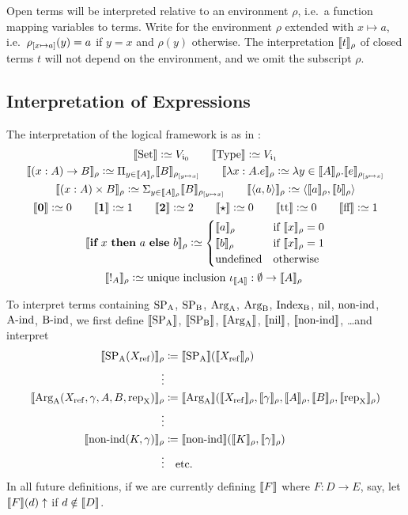 \documentclass{article}
\begin{document}
Open terms will be interpreted relative to an environment $\rho$, i.e.\ a
function mapping variables to terms. Write  for the
environment $\rho$ extended with $x \mapsto a$, i.e.\ $\rhoextend{x}{a}(y) = a$
if $y = x$ and $\rho(y)$ otherwise. The interpretation $\sem{t}_{\rho}$ of closed
terms $t$ will not depend on the environment, and we omit the subscript $\rho$.

\subsection{Interpretation of Expressions}
\noindent 
The interpretation of the logical framework is as in
\cite{dybjersetzer1999finax}:
\begin{gather*}
\sem{\Set} \colonsimeq V_{\cardz} \qquad \sem{\TYPE} \colonsimeq V_{\cardi} \\
\sem{(x : A) \to B}_\rho \colonsimeq \Pi_{y \in
  \sem{A}_\rho}\sem{B}_{\rhoextend{y}{x}} \qquad
\sem{\lambda x:A.e}_\rho \colonsimeq \lambda y \in
\sem{A}_\rho.\sem{e}_{\rhoextend{y}{x}} \\
\sem{(x : A) \times B}_\rho \colonsimeq \Sigma_{y \in
  \sem{A}_\rho}\sem{B}_{\rhoextend{y}{x}} \qquad
\sem{\langle a, b \rangle}_\rho \colonsimeq \langle \sem{a}_\rho ,
\sem{b}_\rho\rangle \\
\sem{\zero} \colonsimeq 0 \qquad \sem{\one} \colonsimeq 1 \qquad
\sem{\two} \colonsimeq 2 \qquad \sem{\oneelt} \colonsimeq 0 \qquad \sem{\twott} \colonsimeq 0 \qquad
\sem{\twoff} \colonsimeq 1\\
\sem{\IF~x~\THEN~a~\ELSE~b}_\rho \colonsimeq
\begin{cases}
\sem{a}_\rho & \text{if $\sem{x}_\rho = 0$} \\
\sem{b}_\rho & \text{if $\sem{x}_\rho = 1$} \\
\text{undefined} & \text{otherwise} \\
\end{cases} \\
\sem{!_A}_\rho \colonsimeq \text{unique inclusion $\iota_{\sem{A}} : \emptyset \to \sem{A}_\rho$ }
\end{gather*}

To interpret terms containing $\SPA$, $\SPB$, $\ArgA$, $\ArgB$, $\IndexB$, 
$\nilA$, $\nonindA$, $\AindA$, $\BindA$, we first define $\sem{\SPA}$,
$\sem{\SPB}$, $\sem{\ArgA}$, $\sem{\nilA}$, $\sem{\nonindA}$, \ldots and interpret
\begin{align*}
\sem{\SPA(\Xref)}_\rho &\coloneqq \sem{\SPA}(\sem{\Xref}_\rho) \\
\vdots \\
\sem{\ArgA(\Xref, \gamma, A, B, \repA)}_\rho &\coloneqq
\sem{\ArgA}(\sem{\Xref}_\rho, \sem{\gamma}_\rho, \sem{A}_\rho, \sem{B}_\rho, \sem{\repA}_\rho) \\
\vdots \\
\sem{\nonindA(K, \gamma)}_\rho &\coloneqq \sem{\nonindA}(\sem{K}_\rho,
\sem{\gamma}_\rho) \\
\vdots & \text{\quad etc.}
\end{align*}
In all future definitions, if we are currently defining $\sem{F}$ where $F : D
\to E$, say, let $\sem{F}(d)\uparrow$ if $d \notin \sem{D}$.
\end{document}
